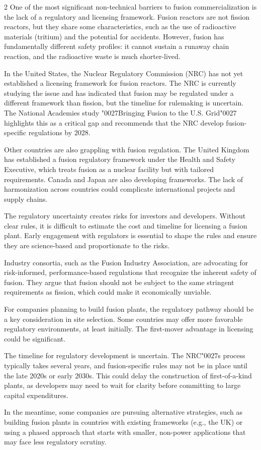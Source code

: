 \documentclass[10pt,a4paper]{article}
\newcommand{\BOApos}{{\BOQuoteFont\char"0027}}
\begin{document}
\begin{multicols}{2}
{\small One of the most significant non-technical barriers to fusion commercialization is the lack of a regulatory and licensing framework. Fusion reactors are not fission reactors, but they share some characteristics, such as the use of radioactive materials (tritium) and the potential for accidents. However, fusion has fundamentally different safety profiles: it cannot sustain a runaway chain reaction, and the radioactive waste is much shorter-lived.}\par
{\small In the United States, the Nuclear Regulatory Commission (NRC) has not yet established a licensing framework for fusion reactors. The NRC is currently studying the issue and has indicated that fusion may be regulated under a different framework than fission, but the timeline for rulemaking is uncertain. The National Academies study \BOApos{}Bringing Fusion to the U.S. Grid\BOApos{} highlights this as a critical gap and recommends that the NRC develop fusion-specific regulations by 2028.}\par
{\small Other countries are also grappling with fusion regulation. The United Kingdom has established a fusion regulatory framework under the Health and Safety Executive, which treats fusion as a nuclear facility but with tailored requirements. Canada and Japan are also developing frameworks. The lack of harmonization across countries could complicate international projects and supply chains.}\par
{\small The regulatory uncertainty creates risks for investors and developers. Without clear rules, it is difficult to estimate the cost and timeline for licensing a fusion plant. Early engagement with regulators is essential to shape the rules and ensure they are science-based and proportionate to the risks.}\par
{\small Industry consortia, such as the Fusion Industry Association, are advocating for risk-informed, performance-based regulations that recognize the inherent safety of fusion. They argue that fusion should not be subject to the same stringent requirements as fission, which could make it economically unviable.}\par
{\small For companies planning to build fusion plants, the regulatory pathway should be a key consideration in site selection. Some countries may offer more favorable regulatory environments, at least initially. The first-mover advantage in licensing could be significant.}\par
{\small The timeline for regulatory development is uncertain. The NRC\BOApos{}s process typically takes several years, and fusion-specific rules may not be in place until the late 2020s or early 2030s. This could delay the construction of first-of-a-kind plants, as developers may need to wait for clarity before committing to large capital expenditures.}\par
{\small In the meantime, some companies are pursuing alternative strategies, such as building fusion plants in countries with existing frameworks (e.g., the UK) or using a phased approach that starts with smaller, non-power applications that may face less regulatory scrutiny.}\par
\end{multicols}
\end{document}
